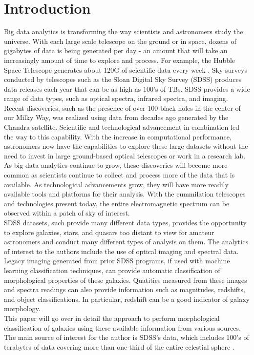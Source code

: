 \documentclass[11pt,sigconf]{acmart}
\begin{document}
\section{Introduction}

Big data analytics is transforming the way scientists and astronomers study the universe. 
With each large scale telescope on the ground or in space, dozens of gigabytes of data 
is being generated per day - an amount that will take an increasingly amount of time
to explore and process. For example, the Hubble Space Telescope generates about 120G of 
scientific data every week \cite{tillman}. Sky surveys conducted by telescopes such as
the Sloan Digital Sky Survey (SDSS) produces data releases each year that can be as high as
100's of TBs. SDSS provides a wide range of data types, such as optical spectra,
infrared spectra, and imaging. 
\\
Recent discoveries, such as the presence of over 100 black holes 
in the center of our Milky Way, was realized using data from decades ago generated by
the Chandra satellite. Scientific and technological advancement in combination led the 
way to this capability. With the increase in computational performance, astronomers 
now have the capabilities to explore these large datasets without the need to invest 
in large ground-based optical telescopes or work in a research lab. 
As big data analytics continue to grow, these discoveries will become more common as 
scientists continue to collect and process more of the data that is available. As technological
advancements grow, they will have more readily available tools and platforms for their 
analysis. With the cummilation telescopes and technologies present today, the entire 
electromagnetic spectrum can be observed within a patch of sky of interest. 
\\
SDSS datasets, such provide many different data types, provides the opportunity to
explore galaxies, stars, and quasars too distant to view for amateur astronomers and 
conduct many different types of analysis on them. The analytics of interest to the
authors include the use of optical imaging and spectral data. Legacy imaging generated 
from prior SDSS programs, if used with machine learning classification techniques, 
can provide automatic classification of morphological properties of these galaxies. 
Quatities measured from these images and spectra readings can also provide information
such as magnitudes, redshifts, and object classifications. In particular, redshift can
be a good indicator of galaxy morphology. 
\\
This paper will go over in detail the approach to perform morphological classification of 
galaxies using these available information from various sources. The main source of interest
for the author is SDSS's data, which includes 100's of terabytes of data covering more
than one-third of the entire celestial sphere \cite{SDSS}.
\end{document}
